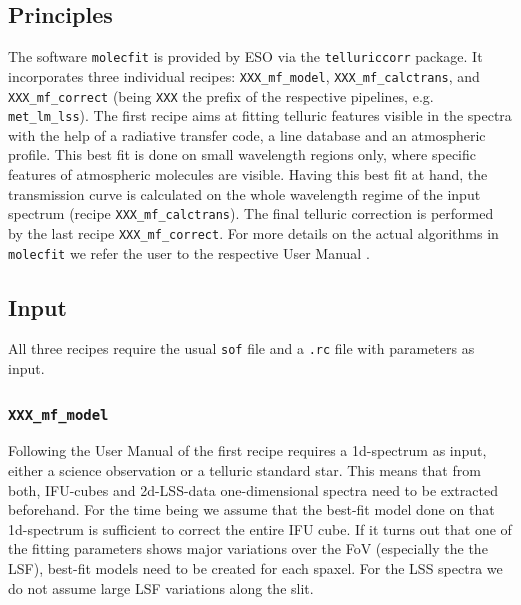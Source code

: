 \subsection{Principles}\label{app:mf_principles}
The software \texttt{molecfit} is provided by \ac{ESO} via the \texttt{telluriccorr} package. It incorporates three individual recipes: \texttt{XXX\_mf\_model}, \texttt{XXX\_mf\_calctrans}, and \texttt{XXX\_mf\_correct} (being \texttt{XXX} the prefix of the respective pipelines, e.g. \texttt{met\_lm\_lss}). The first recipe aims at fitting telluric features visible in the spectra with the help of a radiative transfer code, a line database and an atmospheric profile. This best fit is done on small wavelength regions only, where specific features of atmospheric molecules are visible. Having this best fit at hand, the transmission curve is calculated on the whole wavelength regime of the input spectrum (recipe \texttt{XXX\_mf\_calctrans}). The final telluric correction is performed by the last recipe \texttt{XXX\_mf\_correct}. For more details on the actual algorithms in \texttt{molecfit} we refer the user to the respective User Manual \cite{molecfit}.\\

\subsection{Input}\label{app:mf_input}
All three recipes require the usual \texttt{sof} file and a \texttt{.rc} file with parameters as input.
\subsubsection{\texttt{XXX\_mf\_model}}\label{app:mf_model_recipe}
Following the User Manual of \mf\cite{molecfit} the first recipe requires a 1d-spectrum as input, either a science observation or a telluric standard star. This means that from both, \ac{IFU}-cubes and 2d-\ac{LSS}-data one-dimensional spectra need to be extracted beforehand. For the time being we assume that the best-fit model done on that 1d-spectrum is sufficient to correct the entire \ac{IFU} cube. If it turns out that one of the fitting parameters shows major variations over the \ac{FoV} (especially the the \ac{LSF}), best-fit models need to be created for each spaxel. For the \ac{LSS} spectra we do not assume large \ac{LSF} variations along the slit. \\
